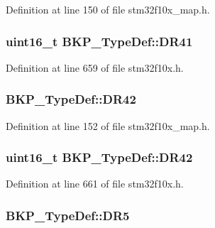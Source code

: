 Definition at line 150 of file stm32f10x\+\_\+map.\+h.

\subsubsection[{\texorpdfstring{D\+R41}{DR41}}]{ {\bf uint16\+\_\+t} B\+K\+P\+\_\+\+Type\+Def\+::\+D\+R41}\hypertarget{struct_b_k_p___type_def_a9e9b72b388e2ed718df333cfb9e90226}{}\label{struct_b_k_p___type_def_a9e9b72b388e2ed718df333cfb9e90226}


Definition at line 659 of file stm32f10x.\+h.

\subsubsection[{\texorpdfstring{D\+R42}{DR42}}]{ B\+K\+P\+\_\+\+Type\+Def\+::\+D\+R42}\hypertarget{struct_b_k_p___type_def_a9ed0ab2e018e70eed504edc36b655b32}{}\label{struct_b_k_p___type_def_a9ed0ab2e018e70eed504edc36b655b32}


Definition at line 152 of file stm32f10x\+\_\+map.\+h.

\subsubsection[{\texorpdfstring{D\+R42}{DR42}}]{ {\bf uint16\+\_\+t} B\+K\+P\+\_\+\+Type\+Def\+::\+D\+R42}\hypertarget{struct_b_k_p___type_def_af7a01e3a3e1be76ebb8100e7ff6de9c0}{}\label{struct_b_k_p___type_def_af7a01e3a3e1be76ebb8100e7ff6de9c0}


Definition at line 661 of file stm32f10x.\+h.

\subsubsection[{\texorpdfstring{D\+R5}{DR5}}]{ B\+K\+P\+\_\+\+Type\+Def\+::\+D\+R5}\hypertarget{struct_b_k_p___type_def_ac139480fa59cc4b08c38cda6c0ca0512}{}\label{struct_b_k_p___type_def_ac139480fa59cc4b08c38cda6c0ca0512}


